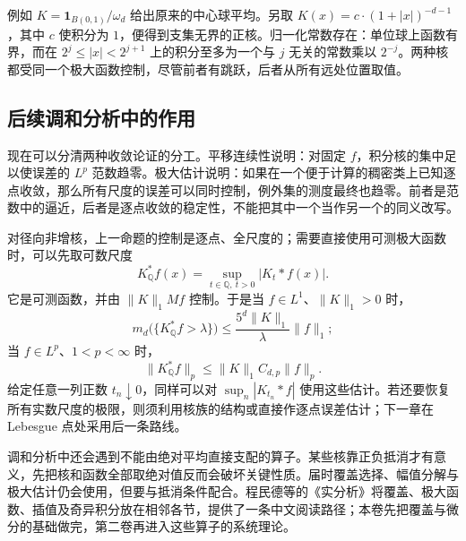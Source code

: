 例如 \(K=\mathbf1_{B(0,1)}/\omega_d\) 给出原来的中心球平均。另取 \(K(x)=c\cdot(1+|x|)^{-d-1}\)，其中 \(c\) 使积分为 \(1\)，便得到支集无界的正核。归一化常数存在：单位球上函数有界，而在 \(2^j\leq|x|<2^{j+1}\) 上的积分至多为一个与 \(j\) 无关的常数乘以 \(2^{-j}\)。两种核都受同一个极大函数控制，尽管前者有跳跃，后者从所有远处位置取值。

\subsection{后续调和分析中的作用}
\label{b1:subsec:130404}

现在可以分清两种收敛论证的分工。平移连续性说明：对固定 \(f\)，积分核的集中足以使误差的 \(L^p\) 范数趋零。极大估计说明：如果在一个便于计算的稠密类上已知逐点收敛，那么所有尺度的误差可以同时控制，例外集的测度最终也趋零。前者是范数中的逼近，后者是逐点收敛的稳定性，不能把其中一个当作另一个的同义改写。

\ProseParagraphBreak

对径向非增核，上一命题的控制是逐点、全尺度的；需要直接使用可测极大函数时，可以先取可数尺度
\[
 K^*_{\mathbb Q}f(x)=\sup_{t\in\mathbb Q,\ t>0}|K_t*f(x)|.
\]
它是可测函数，并由 \(\|K\|_1Mf\) 控制。于是当 \(f\in L^1\)、\(\|K\|_1>0\) 时，
\[
 m_d\bigl(\{K^*_{\mathbb Q}f>\lambda\}\bigr)
 \leq\frac{5^d\|K\|_1}{\lambda}\|f\|_1;
\]
当 \(f\in L^p\)、\(1<p<\infty\) 时，
\[
 \|K^*_{\mathbb Q}f\|_p\leq\|K\|_1 C_{d,p}\|f\|_p.
\]
给定任意一列正数 \(t_n\downarrow0\)，同样可以对 \(\sup_n|K_{t_n}*f|\) 使用这些估计。若还要恢复所有实数尺度的极限，则须利用核族的结构或直接作逐点误差估计；下一章在 Lebesgue 点处采用后一条路线。

\ProseParagraphBreak

调和分析中还会遇到不能由绝对平均直接支配的算子。某些核靠正负抵消才有意义，先把核和函数全部取绝对值反而会破坏关键性质。届时覆盖选择、幅值分解与极大估计仍会使用，但要与抵消条件配合。程民德等的《实分析》\cite[第三章]{Cheng2008RealAnalysis}将覆盖、极大函数、插值及奇异积分放在相邻各节，提供了一条中文阅读路径；本卷先把覆盖与微分的基础做完，第二卷再进入这些算子的系统理论。
